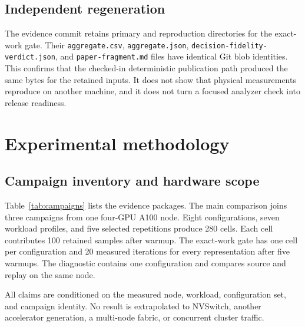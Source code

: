 \documentclass[10pt,twocolumn]{article}
\begin{document}
\subsection{Independent regeneration}

The evidence commit retains primary and reproduction directories for the
exact-work gate. Their \texttt{aggregate.csv}, \texttt{aggregate.json},
\texttt{decision-fidelity-verdict.json}, and \texttt{paper-fragment.md} files
have identical Git blob identities. This confirms that the checked-in
deterministic publication path produced the same bytes for the retained
inputs. It does not show that physical measurements reproduce on another
machine, and it does not turn a focused analyzer check into release readiness.

\section{Experimental methodology}

\subsection{Campaign inventory and hardware scope}

Table~\ref{tab:campaigns} lists the evidence packages. The main comparison
joins three campaigns from one four-GPU A100 node. Eight configurations, seven
workload profiles, and five selected repetitions produce 280 cells. Each cell
contributes 100 retained samples after warmup. The exact-work gate has one cell
per configuration and 20 measured iterations for every representation after
five warmups. The diagnostic contains one configuration and compares source
and replay on the same node.

All claims are conditioned on the measured node, workload, configuration set,
and campaign identity. No result is extrapolated to NVSwitch, another
accelerator generation, a multi-node fabric, or concurrent cluster traffic.
\end{document}
